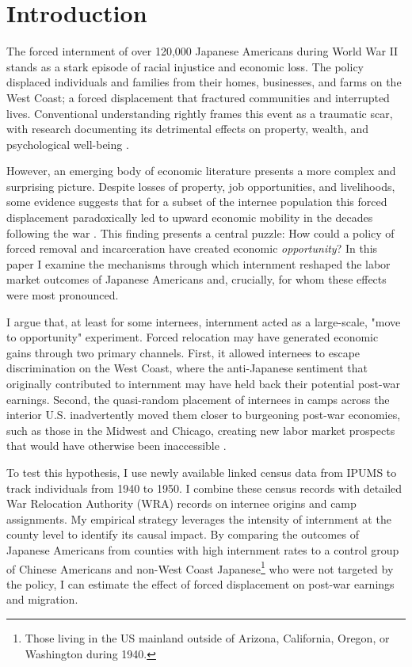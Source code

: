 \section{Introduction}

The forced internment of over 120,000 Japanese Americans during World War II 
stands as a stark episode of racial injustice and economic loss. 
The policy displaced individuals and families 
from their homes, businesses, and farms on the West Coast;
a forced displacement that fractured communities and interrupted lives. 
Conventional understanding rightly frames this event as a traumatic scar, 
with research documenting its detrimental effects 
on property, wealth, and psychological well-being 
\citep{commissiononwartimerelocationPersonalJusticeDenied1983}.

However, an emerging body of economic literature
presents a more complex and surprising picture. 
Despite losses of property, job opportunities, and livelihoods,
some evidence suggests that for a subset of the internee population
this forced displacement paradoxically led to upward economic mobility 
in the decades following the war
\citep{arellano-boverDisplacementDiversityMobility2022,shoagCausalEffectPlace2016}.
This finding presents a central puzzle: 
How could a policy of forced removal and incarceration 
have created economic \textit{opportunity}? 
In this paper I examine the mechanisms through which 
internment reshaped the labor market outcomes of Japanese Americans 
and, crucially, for whom these effects were most pronounced.

I argue that, at least for some internees,
internment acted as a large-scale, "move to opportunity" experiment.
Forced relocation may have generated economic gains through two primary channels.
First, it allowed internees to escape discrimination on the West Coast,
where the anti-Japanese sentiment that originally contributed to internment
may have held back their potential post-war earnings. 
Second, the quasi-random placement of internees in camps across the interior U.S.
inadvertently moved them closer to burgeoning post-war economies, 
such as those in the Midwest and Chicago,
creating new labor market prospects that would have otherwise been inaccessible
\citep{austinEastwardPioneersJapanese2007}.

To test this hypothesis, 
I use newly available linked census data from IPUMS 
to track individuals from 1940 to 1950.
I combine these census records with detailed War Relocation Authority (WRA) 
records on internee origins and camp assignments. 
My empirical strategy leverages the intensity of internment at the county level 
to identify its causal impact. 
By comparing the outcomes of Japanese Americans 
from counties with high internment rates to a control group of Chinese Americans
and non-West Coast Japanese\footnote{Those living in the US mainland outside of Arizona, California, Oregon, or Washington during 1940.}
who were not targeted by the policy,
I can estimate the effect of forced displacement on post-war earnings
and migration.

